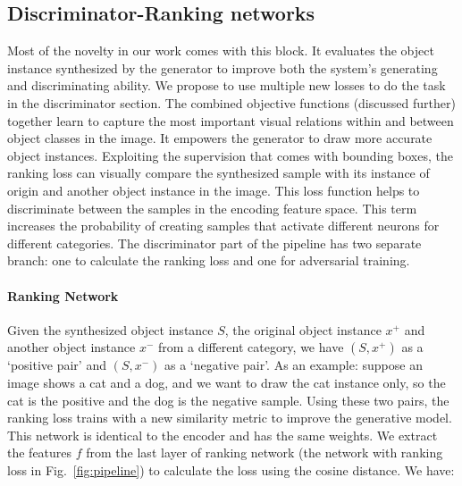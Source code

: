\documentclass[runningheads]{llncs}
\begin{document}
\subsection{Discriminator-Ranking networks}
Most of the novelty in our work comes with this block. It evaluates the object instance synthesized by the generator to improve both the system's generating and discriminating ability. We propose to use multiple new losses to do the task in the discriminator section. The combined objective functions (discussed further) together learn to capture the most important visual relations within and between object classes in the image. It empowers the generator to draw more accurate object instances. Exploiting the supervision that comes with bounding boxes, the ranking loss can visually compare the synthesized sample with its instance of origin and another object instance in the image. This loss function helps to discriminate between the samples in the encoding feature space. This term increases the probability of creating samples that activate different neurons for different categories. The discriminator part of the pipeline has two separate branch: one to calculate the ranking loss and one for adversarial training.

\paragraph{Ranking Network}
Given the synthesized object instance $S$, the original object instance $x^+$ and another object instance $x^-$ from a different category, we have $(S,x^+)$  as a `positive pair' and $(S,x^-)$ as a `negative pair'. As an example: suppose an image shows a cat and a dog, and we want to draw the cat instance only, so the cat is the positive and the dog is the negative sample. Using these two pairs, the ranking loss trains with a new similarity metric to improve the generative model. This network is identical to the encoder and has the same weights. We extract the features $f$ from the last layer of ranking network (the network with ranking loss in Fig.~\ref{fig:pipeline}) to calculate the loss using the cosine distance. We have:
\end{document}

